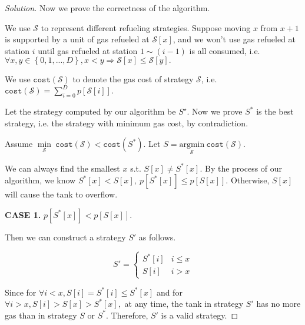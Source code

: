 \documentclass{article}
\newcommand{\set}[1]{\left\{#1\right\}}
\newenvironment{solution}{\begin{proof}[\noindent\it Solution]}{\end{proof}}
\begin{document}
\begin{solution}
    \vspace{2em} \hspace{2.6em}
    Now we prove the correctness of the algorithm.
    
    \hspace{2.6em}
    We use $\mathcal{S}$ to represent different refueling strategies. Suppose moving $x$ from $x+1$ is supported by a unit of gas refueled at $\mathcal{S}[x]$, and we won't use gas refueled at station $i$ until gas refueled at station $1\sim(i-1)$ is all consumed, i.e. $\forall x,y\in\set{0,1,...,D}, x<y\Rightarrow \mathcal{S}[x]\le \mathcal{S}[y].$
    
    \hspace{2.6em}
    We use $\mathtt{cost}(\mathcal{S})$ to denote the gas cost of strategy $\mathcal{S}$, i.e. $\mathtt{cost}(\mathcal{S})=\sum_{i=0}^D p[\mathcal{S}[i]].$
    
    \hspace{2.6em}
    Let the strategy computed by our algorithm be $S^{\star}$. Now we prove $S^*$ is the best strategy, i.e. the strategy with minimum gas cost, by contradiction. 
    
    \hspace{2.6em}
    Assume $\underset{\mathcal{S}}{\min}\ \mathtt{cost}(\mathcal{S}) < \mathtt{cost}(S^*)$. Let $S = \underset{\mathcal{S}}{\mathrm{argmin}}\  \mathtt{cost}(\mathcal{S})$.
    
    \vspace{0.3em} \hspace{2.6em}
    We can always find the smallest $x$ s.t. $S[x]\neq S^*[x]$. By the process of our algorithm, we know $S^*[x]<S[x],\ p[S^*[x]]\le p[S[x]]$. Otherwise, $S[x]$ will cause the tank to overflow.
    
    \vspace{2em}\hspace{-2em}
    \textbf{CASE 1.} $p[S^*[x]]<p[S[x]]$.
    
    \hspace{2.6em}
    Then we can construct a strategy $S'$ as follows. 
    
    \vspace{-1em}
    $$ S' = \left\{\begin{array}{ll}
        S^*[i] & i\le x\\
        S[i] & i>x
    \end{array}\right.$$
    
    \hspace{2.6em}
    Since for $\forall i<x, S[i]=S^*[i]\le S^*[x]$ and for $\forall i>x, S[i]>S[x]>S^*[x],$ at any time, the tank in strategy $S'$ has no more gas than in strategy $S$ or $S^*$. Therefore, $S'$ is a valid strategy.
    

\end{solution}
\end{document}
